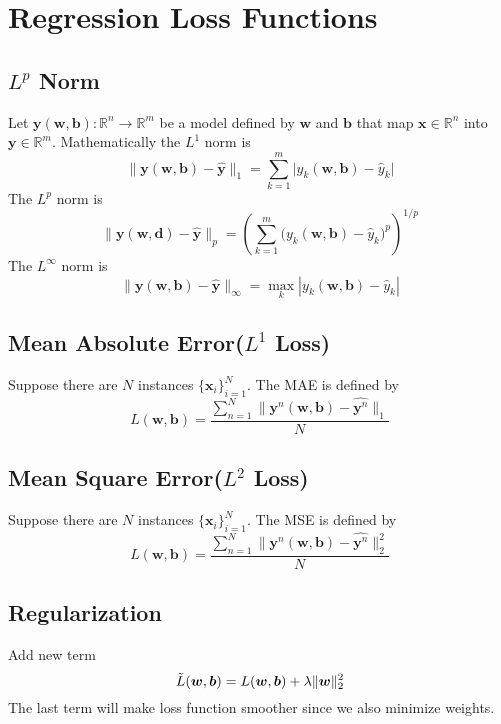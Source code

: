 \documentclass[../main.tex]{subfiles}
\begin{document}
    \section{Regression Loss Functions}
        \subsection{\texorpdfstring{$L^p$}{Lp} Norm}
            Let $\boldsymbol{y}(\boldsymbol{w},\boldsymbol{b}): \mathbb{R}^n \rightarrow \mathbb{R}^m$ be a model defined by $\boldsymbol{w}$ and $\boldsymbol{b}$ that map $\boldsymbol{x} \in \mathbb{R}^n$ into $\boldsymbol{y} \in \mathbb{R}^m$. Mathematically the $L^1$ norm is
            \[
                \| \boldsymbol{y}(\boldsymbol{w},\boldsymbol{b}) - \hat{\boldsymbol{y}} \|_1 = \sum_{k=1}^m \big| y_k(\boldsymbol{w},\boldsymbol{b}) - \hat{y}_k \big|
            \]
            The $L^p$ norm is
            \[
                \| \boldsymbol{y}(\boldsymbol{w},\boldsymbol{d}) - \hat{\boldsymbol{y}}\|_p = \left( \sum_{k=1}^m \big(y_k(\boldsymbol{w},\boldsymbol{b})-\hat{y}_k\big)^p \right)^{1/p}
            \]
            The $L^\infty$ norm is
            \[
                \| \boldsymbol{y}(\boldsymbol{w}, \boldsymbol{b}) - \hat{\boldsymbol{y}}\|_{\infty} = \max_{k} |y_k(\boldsymbol{w},\boldsymbol{b}) - \hat{y}_k|
            \]
        \subsection{Mean Absolute Error(\texorpdfstring{$L^1$}{L1} Loss)}
            Suppose there are $N$ instances $\{ \boldsymbol{x}_i \}_{i=1}^N$. The MAE is defined by
            \[
                L(\boldsymbol{w},\boldsymbol{b}) = \frac{\sum_{n=1}^N \| \boldsymbol{y}^n(\boldsymbol{w},\boldsymbol{b}) - \hat{\boldsymbol{y}^n} \|_1}{N}
            \]
        \subsection{Mean Square Error(\texorpdfstring{$L^2$}{L2} Loss)}
            Suppose there are $N$ instances $\{ \boldsymbol{x}_i \}_{i=1}^N$. The MSE is defined by
            \[
                L(\boldsymbol{w},\boldsymbol{b}) = \frac{\sum_{n=1}^N \| \boldsymbol{y}^n(\boldsymbol{w},\boldsymbol{b}) - \hat{\boldsymbol{y}^n}\|_2^2}{N}
            \]
        \subsection{Regularization}
            Add new term
            \[
                \Tilde{L}(\boldsymbol{w},\boldsymbol{b}) = L(\boldsymbol{w},\boldsymbol{b}) + \lambda \| \boldsymbol{w} \|_2^2
            \]
            The last term will make loss function smoother since we also minimize weights.
\end{document}
